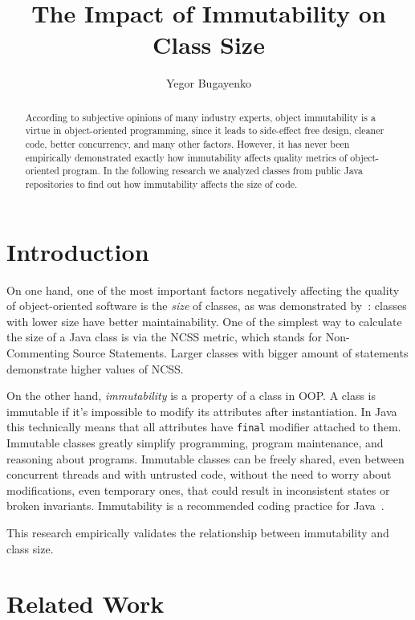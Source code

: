 \documentclass[12pt]{article}
\title{The Impact of Immutability on Class Size}
\author{Yegor Bugayenko}{}{}
\begin{document}
\raggedbottom
\maketitle

\begin{abstract}
According to subjective opinions of many industry experts,
object immutability is a virtue in object-oriented programming, since it
leads to side-effect free design, cleaner code, better concurrency,
and many other factors. However, it has never been empirically
demonstrated exactly how immutability affects quality metrics of
object-oriented program. In the following research we analyzed
\thetotaljavafiles{} classes from \thetotalrepos{} public Java repositories
to find out how immutability affects the size of code.
\end{abstract}

\section{Introduction}

On one hand, one of the most important factors negatively affecting the quality
of object-oriented software is the \emph{size} of classes, as was
demonstrated by~\citet{li1993,al2013}: classes with lower size have better maintainability.
One of the simplest way
to calculate the size of a Java class is via the NCSS metric, which
stands for Non-Commenting Source Statements. Larger classes with bigger
amount of statements demonstrate higher values of NCSS.

On the other hand, \emph{immutability} is a property of a class in OOP. A class is immutable if
it's impossible to modify its attributes after instantiation. In Java this
technically means that all attributes have \texttt{final} modifier attached
to them.
Immutable classes greatly simplify programming, program maintenance, and
reasoning about programs. Immutable classes can be freely shared, even between
concurrent threads and with untrusted code, without the need to worry
about modifications, even temporary ones, that could result in
inconsistent states or broken invariants.
Immutability is a recommended coding practice for Java~\citep{bloch2016}.

This research empirically validates the relationship between immutability
and class size.

\section{Related Work}
\end{document}
